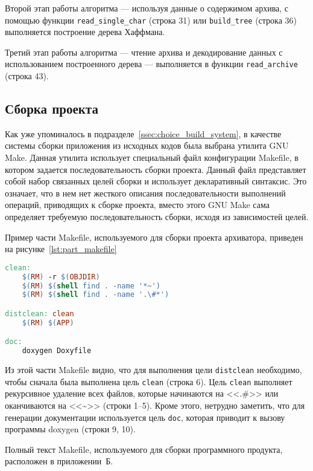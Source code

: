 Второй этап работы алгоритма --- используя данные о содержимом архива,
с помощью функции \texttt{read\_single\_char} (строка 31) или
\texttt{build\_tree} (строка 36) выполняется построение дерева Хаффмана.

Третий этап работы алгоритма --- чтение архива и декодирование данных
с использованием построенного дерева --- выполняется в функции
\texttt{read\_archive} (строка 43). 

\subsection{Сборка проекта}

Как уже упоминалось в подразделе~\ref{ssec:choice_build_system},
в качестве системы сборки приложения из исходных кодов была выбрана утилита
GNU Make. Данная утилита использует специальный файл конфигурации Makefile,
в котором задается последовательность сборки проекта.
Данный файл представляет собой набор связанных целей сборки и 
использует декларативный синтаксис. 
Это означает, что в нем нет жесткого описания последовательности 
выполнений операций, приводящих к сборке проекта, 
вместо этого GNU Make сама определяет требуемую последовательность сборки, 
исходя из зависимостей целей.

Пример части Makefile, используемого для сборки проекта архиватора,
приведен на рисунке~\ref{lst:part_makefile}

\begin{lstlisting}[basicstyle=\scriptsize\ttfamily,
                   numberstyle=\scriptsize\ttfamily,
                   xleftmargin=7mm,
                   language=make,caption=Пример Makefile сборки проекта,
                   label=lst:part_makefile]
clean:
	$(RM) -r $(OBJDIR)
	$(RM) $(shell find . -name '*~')
	$(RM) $(shell find . -name '.\#*')

distclean: clean
	$(RM) $(APP)

doc: 
	doxygen Doxyfile
\end{lstlisting}

Из этой части Makefile видно, что для выполнения цели \texttt{distclean}
необходимо, чтобы сначала была выполнена цель \texttt{clean} (строка 6).
Цель \texttt{clean} выполняет рекурсивное удаление всех файлов, 
которые начинаются на <<.\#>> или оканчиваются на <<\textasciitilde>> 
(строки 1--5). 
Кроме этого, нетрудно заметить, что для генерации документации используется 
цель \texttt{doc}, которая приводит к вызову программы doxygen (строки 9, 10).

Полный текст Makefile, используемого для сборки программного продукта, 
расположен в приложении~Б.
